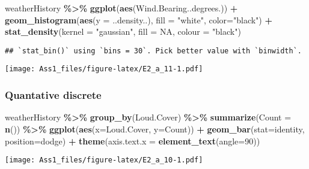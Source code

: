 \documentclass[
]{article}
\newenvironment{Shaded}{\begin{snugshade}}{\end{snugshade}}
\newcommand{\AttributeTok}[1]{\textcolor[rgb]{0.13,0.29,0.53}{#1}}
\newcommand{\ConstantTok}[1]{\textcolor[rgb]{0.56,0.35,0.01}{#1}}
\newcommand{\DecValTok}[1]{\textcolor[rgb]{0.00,0.00,0.81}{#1}}
\newcommand{\FunctionTok}[1]{\textcolor[rgb]{0.13,0.29,0.53}{\textbf{#1}}}
\newcommand{\NormalTok}[1]{#1}
\newcommand{\SpecialCharTok}[1]{\textcolor[rgb]{0.81,0.36,0.00}{\textbf{#1}}}
\newcommand{\StringTok}[1]{\textcolor[rgb]{0.31,0.60,0.02}{#1}}
\begin{document}
\begin{Shaded}
\begin{Highlighting}[]
\NormalTok{weatherHistory }\SpecialCharTok{\%\textgreater{}\%}
  \FunctionTok{ggplot}\NormalTok{(}\FunctionTok{aes}\NormalTok{(Wind.Bearing..degrees.)) }\SpecialCharTok{+}
  \FunctionTok{geom\_histogram}\NormalTok{(}\FunctionTok{aes}\NormalTok{(}\AttributeTok{y =}\NormalTok{ ..density..), }\AttributeTok{fill =} \StringTok{"white"}\NormalTok{, }\AttributeTok{color=}\StringTok{"black"}\NormalTok{) }\SpecialCharTok{+}
  \FunctionTok{stat\_density}\NormalTok{(}\AttributeTok{kernel =} \StringTok{"gaussian"}\NormalTok{, }\AttributeTok{fill =} \ConstantTok{NA}\NormalTok{, }\AttributeTok{colour =} \StringTok{"black"}\NormalTok{)}
\end{Highlighting}
\end{Shaded}

\begin{verbatim}
## `stat_bin()` using `bins = 30`. Pick better value with `binwidth`.
\end{verbatim}

\texttt{[image: Ass1\_files/figure-latex/E2\_a\_11-1.pdf]}

\subsubsection{Quantative discrete}\label{quantative-discrete}

\begin{Shaded}
\begin{Highlighting}[]
\NormalTok{weatherHistory }\SpecialCharTok{\%\textgreater{}\%}
  \FunctionTok{group\_by}\NormalTok{(Loud.Cover) }\SpecialCharTok{\%\textgreater{}\%}
  \FunctionTok{summarize}\NormalTok{(}\AttributeTok{Count =} \FunctionTok{n}\NormalTok{()) }\SpecialCharTok{\%\textgreater{}\%}
  \FunctionTok{ggplot}\NormalTok{(}\FunctionTok{aes}\NormalTok{(}\AttributeTok{x=}\NormalTok{Loud.Cover, }\AttributeTok{y=}\NormalTok{Count)) }\SpecialCharTok{+}
  \FunctionTok{geom\_bar}\NormalTok{(}\AttributeTok{stat=}\StringTok{\textquotesingle{}identity\textquotesingle{}}\NormalTok{, }\AttributeTok{position=}\StringTok{\textquotesingle{}dodge\textquotesingle{}}\NormalTok{) }\SpecialCharTok{+}
  \FunctionTok{theme}\NormalTok{(}\AttributeTok{axis.text.x =} \FunctionTok{element\_text}\NormalTok{(}\AttributeTok{angle=}\DecValTok{90}\NormalTok{))}
\end{Highlighting}
\end{Shaded}

\texttt{[image: Ass1\_files/figure-latex/E2\_a\_10-1.pdf]}
\end{document}

